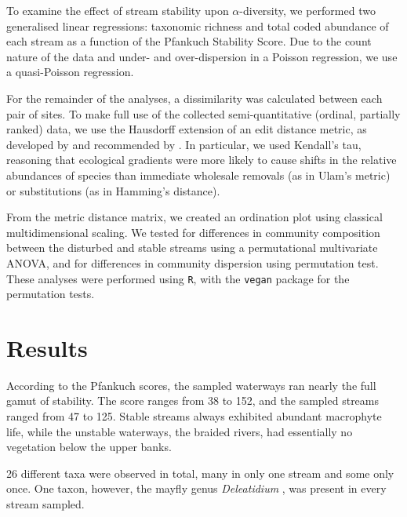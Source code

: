 \documentclass[a4paper,10pt]{article}
\newcommand\spbinom[1]{%
	\emph{#1}%
}
\begin{document}
To examine the effect of stream stability upon $\alpha$-diversity, we performed two generalised linear regressions: taxonomic richness and total coded abundance of each stream as a function of the Pfankuch Stability Score.
Due to the count nature of the data and under- and over-dispersion in a Poisson regression, we use a quasi-Poisson regression.

For the remainder of the analyses, a dissimilarity was calculated between each pair of sites.
To make full use of the collected semi-quantitative (ordinal, partially ranked) data, we use the Hausdorff extension of an edit distance metric, as developed by \textcite{critchlow} and recommended by \textcite{dissimilarity-partially-ranked}.
In particular, we used Kendall's tau, reasoning that ecological gradients were more likely to cause shifts in the relative abundances of species than immediate wholesale removals (as in Ulam's metric) or substitutions (as in Hamming's distance).

From the metric distance matrix, we created an ordination plot using classical multidimensional scaling.
We tested for differences in community composition between the disturbed and stable streams using a permutational multivariate ANOVA, and for differences in community dispersion using  permutation test.
These analyses were performed using \texttt{R}, with the \texttt{vegan} package \parencite{vegan} for the permutation tests.


\section*{Results}

According to the Pfankuch scores, the sampled waterways ran nearly the full gamut of stability.
The score ranges from 38 to 152, and the sampled streams ranged from 47 to 125.
Stable streams always exhibited abundant macrophyte life, while the unstable waterways, the braided rivers, had essentially no vegetation below the upper banks.

26 different taxa were observed in total, many in only one stream and some only once.
One taxon, however, the mayfly genus \spbinom{Deleatidium}, was present in every stream sampled.

\end{document}
